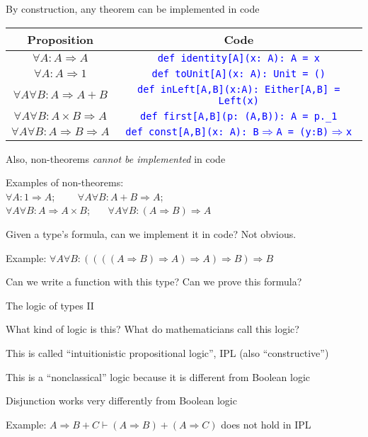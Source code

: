 By construction, any theorem can be implemented in code
\begin{center}
\begin{tabular}{|c|c|}
\hline 
\textbf{Proposition} & \textbf{Code}\tabularnewline
\hline 
\hline 
$\forall A:A\Rightarrow A$ & \texttt{\textcolor{blue}{\footnotesize{}def identity{[}A{]}(x:\ A):\ A
= x}}\tabularnewline
\hline 
$\forall A:A\Rightarrow1$ & \texttt{\textcolor{blue}{\footnotesize{}def toUnit{[}A{]}(x:\ A): Unit
= ()}}\tabularnewline
\hline 
$\forall A\forall B:A\Rightarrow A+B$ & \texttt{\textcolor{blue}{\footnotesize{}def inLeft{[}A,B{]}(x:A):\ Either{[}A,B{]}
= Left(x)}}\tabularnewline
\hline 
$\forall A\forall B:A\times B\Rightarrow A$ & \texttt{\textcolor{blue}{\footnotesize{}def first{[}A,B{]}(p:\ (A,B)):\ A
= p.\_1}}\tabularnewline
\hline 
$\forall A\forall B:A\Rightarrow B\Rightarrow A$ & \texttt{\textcolor{blue}{\footnotesize{}def const{[}A,B{]}(x:\ A):\ B$\Rightarrow$A
= (y:B)$\Rightarrow$x}}\tabularnewline
\hline 
\end{tabular}
\par\end{center}

Also, non-theorems \emph{cannot be implemented} in code 

Examples of non-theorems:\\
 $\forall A:1\Rightarrow A$; \  \  $\quad\forall A\forall B:A+B\Rightarrow A$;
\\
$\forall A\forall B:A\Rightarrow A\times B$; \  $\quad\forall A\forall B:(A\Rightarrow B)\Rightarrow A$

Given a type's formula, can we implement it in code? Not obvious.

Example: $\forall A\forall B:((((A\Rightarrow B)\Rightarrow A)\Rightarrow A)\Rightarrow B)\Rightarrow B$

Can we write a function with this type? Can we prove this formula?

The logic of types II

What kind of logic is this? What do mathematicians call this logic?

This is called ``intuitionistic propositional logic'', IPL (also
``constructive'')

This is a ``nonclassical'' logic because it is different from Boolean
logic

Disjunction works very differently from Boolean logic

Example: $A\Rightarrow B+C\vdash(A\Rightarrow B)+(A\Rightarrow C)$
does not hold in IPL

